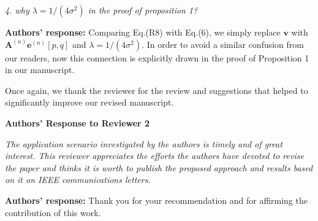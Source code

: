 \documentclass[onecolumn, 11pt, draftclsnofoot]{IEEEtran}
\begin{document}
\vspace{0.5cm}

\noindent
\emph{4. why $\lambda = 1/(4\sigma^2)$ in the proof of proposition 1?}

\noindent \textbf{Authors' response:}
Comparing Eq.(R8) with Eq.(6), we simply replace $\mathbf{v}$ with
$\mathbf{A}^{(n)}\mathbf{e}^{(n)}[p,q]$ and $\lambda = 1/(4\sigma^2)$. In order
to avoid a similar confusion from our readers, now this connection is explicitly
drawn in the proof of Proposition 1 in our manuscript.
 
\vspace{0.5cm}


Once again, we thank the reviewer for the review and suggestions that helped to
significantly improve our revised manuscript. 

\newpage
\begin{center}
{\LARGE \textbf{Authors' Response to Reviewer 2}}
\end{center}

\noindent
\emph{The application scenario investigated by the authors is timely and of
great interest. This reviewer appreciates the efforts the authors have devoted
to revise the paper and thinks it is worth to publish the proposed approach and
results based on it on IEEE communications letters.}

\noindent \textbf{Authors' response:}
Thank you for your recommendation and for affirming the contribution of this work. 

\vspace{0.5cm}



\end{document}
